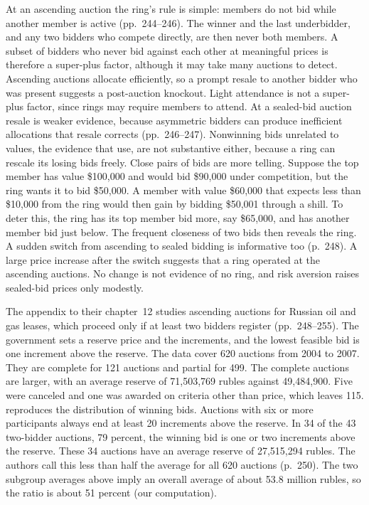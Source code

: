 At an ascending auction the ring's rule is simple: members do not bid while another member is active
(pp.~244--246). The winner and the last underbidder, and any two bidders who compete directly, are then
never both members. A subset of bidders who never bid against each other at meaningful prices is therefore
a super-plus factor, although it may take many auctions to detect. Ascending auctions allocate efficiently,
so a prompt resale to another bidder who was present suggests a post-auction knockout. Light attendance is
not a super-plus factor, since rings may require members to attend. At a sealed-bid auction resale is
weaker evidence, because asymmetric bidders can produce inefficient allocations that resale corrects
(pp.~246--247). Nonwinning bids unrelated to values, the evidence that \citet{PorterZona1993} use, are not
substantive either, because a ring can rescale its losing bids freely. Close pairs of bids are more telling.
Suppose the top member has value \$100,000 and would bid \$90,000 under competition, but the ring wants it to
bid \$50,000. A member with value \$60,000 that expects less than \$10,000 from the ring would then gain by
bidding \$50,001 through a shill. To deter this, the ring has its top member bid more, say \$65,000, and has
another member bid just below. The frequent closeness of two bids then reveals the ring. A sudden switch
from ascending to sealed bidding is informative too (p.~248). A large price increase after the switch
suggests that a ring operated at the ascending auctions. No change is not evidence of no ring, and risk
aversion raises sealed-bid prices only modestly.

The appendix to their chapter~12 studies ascending auctions for Russian oil and gas leases, which proceed
only if at least two bidders register (pp.~248--255). The government sets a reserve price and the
increments, and the lowest feasible bid is one increment above the reserve. The data cover 620 auctions
from 2004 to 2007. They are complete for 121 auctions and partial for 499. The complete auctions are larger,
with an average reserve of 71,503,769 rubles against 49,484,900. Five were canceled and one was awarded on
criteria other than price, which leaves 115.  reproduces the distribution of winning
bids. Auctions with six or more participants always end at least 20 increments above the reserve. In 34
of the 43 two-bidder auctions, 79 percent, the winning bid is one or two increments above the reserve.
These 34 auctions have an average reserve of 27,515,294 rubles. The authors call this less than half the
average for all 620 auctions (p.~250). The two subgroup averages above imply an overall average of about
53.8 million rubles, so the ratio is about 51 percent (our computation).

